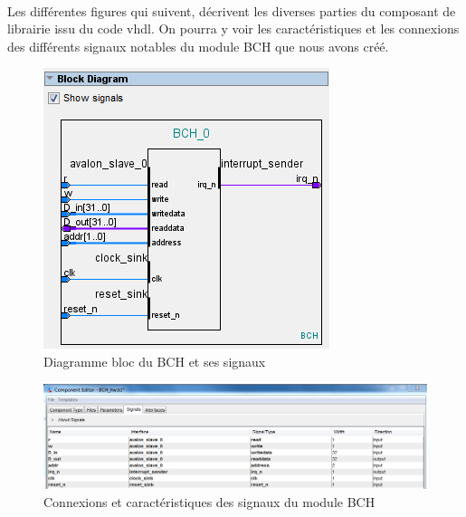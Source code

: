 \documentclass[a4paper, 11pt, svgnames]{report}
\begin{document}
        \paragraph{}
            Les différentes figures qui suivent, décrivent les diverses
            parties du composant de librairie issu du code vhdl. On pourra y
            voir les caractéristiques et les connexions des différents signaux
            notables du module BCH que nous avons créé.

        \begin{figure}[H]
            \centering
            \includegraphics[width=\textwidth]{./images/BCH_0_block_diagram}
            \caption{Diagramme bloc du BCH et ses signaux}
            \label{fig:BCH_0_block_diagram}
        \end{figure}

        \begin{figure}[H]
            \centering
            \includegraphics[width=\textwidth]{./images/BCH_hw_signals}
            \caption{Connexions et caractéristiques des signaux du module BCH}
            \label{fig:BCH_hw_signals}
        \end{figure}
\end{document}
